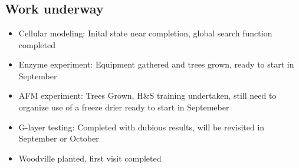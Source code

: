 \chapter*{}
\section{Work underway}
\begin{itemize}
\item Cellular modeling:
Inital state near completion, global search function completed
\end{itemize}

\begin{itemize}
\item Enzyme experiment: 
Equipment gathered and trees grown, ready to start in September
\end{itemize}
\begin{itemize}
\item AFM experiment:
Trees Grown, H\&S training undertaken, still need to organize use of a freeze drier
ready to start in Septemeber
\end{itemize}
\begin{itemize}
\item G-layer testing:
Completed with dubious results, will be revisited in September or October
\end{itemize}
\begin{itemize}
\item Woodville planted, first visit completed
\end{itemize}
  
  
  
  
  